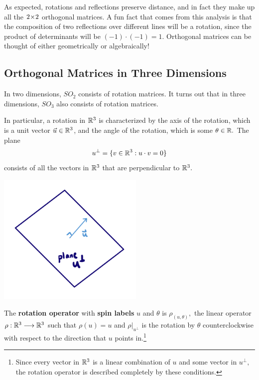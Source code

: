 As expected, rotations and reflections preserve distance, and in fact they make up all the $2 \hspace{0.05em}{\times}\hspace{0.05em} 2$ orthogonal matrices. A fun fact that comes from this analysis is that the composition of two reflections over different lines will be a rotation, since the product of determinants will be $(-1)\cdot(-1) = 1.$ Orthogonal matrices can be thought of either geometrically or algebraically!

\subsection{Orthogonal Matrices in Three Dimensions}


In two dimensions, $SO_2$ consists of rotation matrices. It turns out that in three dimensions, $SO_3$ also consists of rotation matrices. 

In particular, a rotation in $\mathbb R^3$ is characterized by the axis of the rotation, which is a unit vector $\vec{u} \in \mathbb R^3$, and the angle of the rotation, which is some $\theta \in \mathbb R.$
The plane \[u^{\perp} = \{v \in \mathbb R^3: u \cdot v = 0\}\] consists of all the vectors in $\mathbb R^3$ that are perpendicular to $\mathbb R^3.$ 

\begin{center}
    \includegraphics[width=7cm]{Lecture Files and Images/lec12-4.png}
\end{center}

\begin{definition}
The \textbf{rotation operator} with \textbf{spin labels} $u$ and $\theta$ is $\rho_{(u, \theta)},$ the linear operator $\rho: \mathbb R^3 \longrightarrow \mathbb R^3$ such that $\rho(u) = u$ and $\rho|_{u^{\perp}}$ is the rotation by $\theta$ counterclockwise with respect to the direction that $u$ points in.\footnote{Since every vector in $\mathbb R^3$ is a linear combination of $u$ and some vector in $u^{\perp},$ the rotation operator is described completely by these conditions.}
\end{definition}

